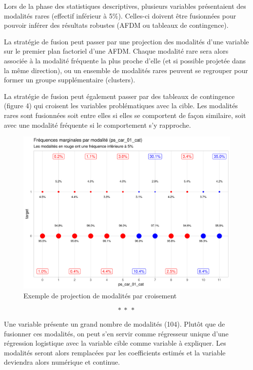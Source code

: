 \documentclass[french]{article}
\begin{document}
\begin{multicols}{2}
Lors de la phase des statistiques descriptives, plusieurs variables présentaient des modalités rares (effectif inférieur à 5\%). Celles-ci doivent être fusionnées pour pouvoir inférer des résultats robustes (AFDM ou tableaux de contingence).

La stratégie de fusion peut passer par une projection des modalités d'une variable sur le premier plan factoriel d'une AFDM. Chaque modalité rare sera alors associée à la modalité fréquente la plus proche d'elle (et si possible projetée dans la même direction), ou un ensemble de modalités rares peuvent se regrouper pour former un groupe supplémentaire (clusters).

La stratégie de fusion peut également passer par des tableaux de contingence (figure 4) qui croisent les variables problématiques avec la cible. Les modalités rares sont fusionnées soit entre elles si elles se comportent de façon similaire, soit avec une modalité fréquente si le comportement s'y rapproche.

\begin{figure}[H] \centering
  \includegraphics[width = \columnwidth]{img/ex_tabc}
  \caption{Exemple de projection de modalités par croisement}
\end{figure}

\[ * \ * \ * \]

Une variable présente un grand nombre de modalités (104). Plutôt que de fusionner ces modalités, on peut s'en servir comme régresseur unique d'une régression logistique avec la variable cible comme variable à expliquer. Les modalités seront alors remplacées par les coefficients estimés et la variable deviendra alors numérique et continue.


\end{multicols}
\end{document}

